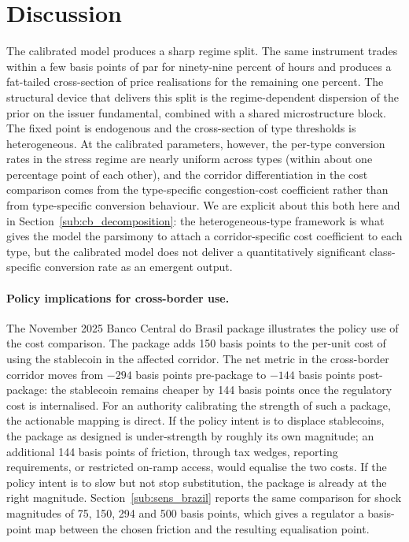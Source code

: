\section{Discussion}\label{sec:discussion}

The calibrated model produces a sharp regime split. The same instrument trades within a few basis points of par for ninety-nine percent of hours and produces a fat-tailed cross-section of price realisations for the remaining one percent. The structural device that delivers this split is the regime-dependent dispersion of the prior on the issuer fundamental, combined with a shared microstructure block. The fixed point is endogenous and the cross-section of type thresholds is heterogeneous. At the calibrated parameters, however, the per-type conversion rates in the stress regime are nearly uniform across types (within about one percentage point of each other), and the corridor differentiation in the cost comparison comes from the type-specific congestion-cost coefficient rather than from type-specific conversion behaviour. We are explicit about this both here and in Section~\ref{sub:cb_decomposition}: the heterogeneous-type framework is what gives the model the parsimony to attach a corridor-specific cost coefficient to each type, but the calibrated model does not deliver a quantitatively significant class-specific conversion rate as an emergent output.

\paragraph{Policy implications for cross-border use.} The November 2025 Banco Central do Brasil package illustrates the policy use of the cost comparison. The package adds 150 basis points to the per-unit cost of using the stablecoin in the affected corridor. The net metric in the cross-border corridor moves from $-294$ basis points pre-package to $-144$ basis points post-package: the stablecoin remains cheaper by 144 basis points once the regulatory cost is internalised. For an authority calibrating the strength of such a package, the actionable mapping is direct. If the policy intent is to displace stablecoins, the package as designed is under-strength by roughly its own magnitude; an additional 144 basis points of friction, through tax wedges, reporting requirements, or restricted on-ramp access, would equalise the two costs. If the policy intent is to slow but not stop substitution, the package is already at the right magnitude. Section~\ref{sub:sens_brazil} reports the same comparison for shock magnitudes of 75, 150, 294 and 500 basis points, which gives a regulator a basis-point map between the chosen friction and the resulting equalisation point.

